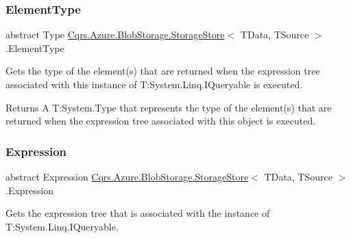 \mbox{\label{classCqrs_1_1Azure_1_1BlobStorage_1_1StorageStore_af298920154f31a7d0117facbb2f7cd54}} 
\subsubsection{\texorpdfstring{Element\+Type}{ElementType}}
{\footnotesize\ttfamily abstract Type \hyperlink{classCqrs_1_1Azure_1_1BlobStorage_1_1StorageStore}{Cqrs.\+Azure.\+Blob\+Storage.\+Storage\+Store}$<$ T\+Data, T\+Source $>$.Element\+Type\hspace{0.3cm}{\ttfamily [get]}}



Gets the type of the element(s) that are returned when the expression tree associated with this instance of T\+:\+System.\+Linq.\+I\+Queryable is executed. 

\begin{DoxyReturn}{Returns}
A T\+:\+System.\+Type that represents the type of the element(s) that are returned when the expression tree associated with this object is executed. 
\end{DoxyReturn}
\mbox{\label{classCqrs_1_1Azure_1_1BlobStorage_1_1StorageStore_a21c204b514718b8af550ce2a627c4b70}} 
\subsubsection{\texorpdfstring{Expression}{Expression}}
{\footnotesize\ttfamily abstract Expression \hyperlink{classCqrs_1_1Azure_1_1BlobStorage_1_1StorageStore}{Cqrs.\+Azure.\+Blob\+Storage.\+Storage\+Store}$<$ T\+Data, T\+Source $>$.Expression\hspace{0.3cm}{\ttfamily [get]}}



Gets the expression tree that is associated with the instance of T\+:\+System.\+Linq.\+I\+Queryable. 

